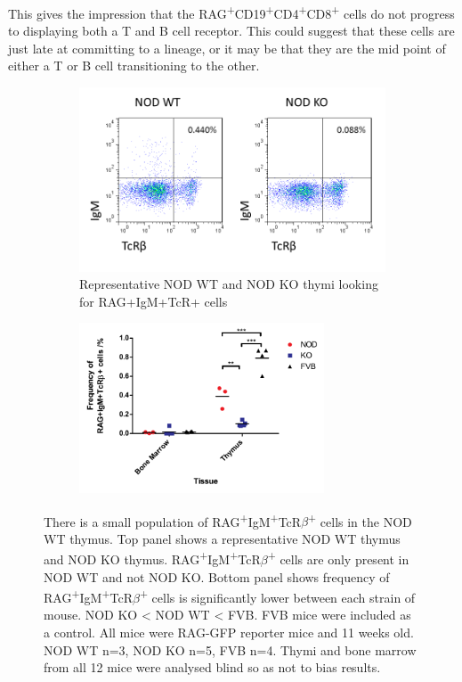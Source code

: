 This gives the impression that the RAG\textsuperscript{+}CD19\textsuperscript{+}CD4\textsuperscript{+}CD8\textsuperscript{+} cells do not progress to displaying both a T and B cell receptor.
This could suggest that these cells are just late at committing to a lineage, or it may be that they are the mid point of either a T or B cell transitioning to the other.


\begin{figure}
	\begin{subfigure}{\textwidth}
	\includegraphics[width=\textwidth]{Figures/ThyRAGIgMTcR.png}
	\caption{Representative NOD WT and NOD KO thymi looking for RAG+IgM+TcR+ cells}
	\label{subfig:BMvThyRAGIgMTcR}
	\end{subfigure}
	\begin{subfigure}{\textwidth}
	\centering
	\includegraphics[width=0.8\textwidth]{Figures/IgMTcRposgraph.pdf}
	\caption{}
	\label{subfig:IgMTcRposgraph}
	\end{subfigure}
\caption{There is a small population of RAG\textsuperscript{+}IgM\textsuperscript{+}TcR$\beta$\textsuperscript{+} cells in the NOD WT thymus. 
Top panel shows a representative NOD WT thymus and NOD KO thymus.
RAG\textsuperscript{+}IgM\textsuperscript{+}TcR$\beta$\textsuperscript{+} cells are only present in NOD WT and not NOD KO.
Bottom panel shows frequency of RAG\textsuperscript{+}IgM\textsuperscript{+}TcR$\beta$\textsuperscript{+} cells is significantly lower between each strain of mouse. NOD KO < NOD WT < FVB. FVB mice were included as a control.
All mice were RAG-GFP reporter mice and 11 weeks old. NOD WT n=3, NOD KO n=5, FVB n=4.
Thymi and bone marrow from all 12 mice were analysed blind so as not to bias results.}
\label{fig:RAGIgMTcRpos}
\end{figure}

